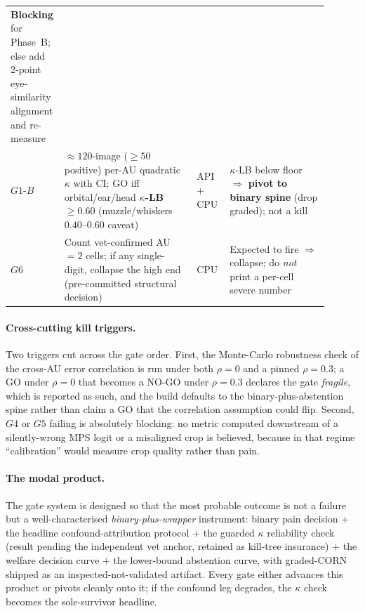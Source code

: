 \begin{table}[t]
\begin{tabular}{@{}p{0.10\linewidth}p{0.40\linewidth}p{0.10\linewidth}p{0.30\linewidth}@{}}
\textbf{Blocking} for Phase~B; else add 2-point eye-similarity alignment and re-measure \\
\addlinespace
$G1\text{-}B$ & $\approx 120$-image ($\geq 50$ positive) per-AU quadratic $\kappa$ with CI;
GO iff orbital/ear/head $\kappa$\textbf{-LB} $\geq 0.60$ (muzzle/whiskers $0.40\text{--}0.60$
caveat) &
API + CPU &
$\kappa$-LB below floor $\Rightarrow$ \textbf{pivot to binary spine} (drop graded); not a kill \\
\addlinespace
$G6$ & Count vet-confirmed AU$=2$ cells; if any single-digit, collapse the high end
(pre-committed structural decision) &
CPU &
Expected to fire $\Rightarrow$ collapse; do \emph{not} print a per-cell severe number \\
\bottomrule
\end{tabular}
\end{table}

\paragraph{Cross-cutting kill triggers.} Two triggers cut across the gate order. First, the
Monte-Carlo robustness check of the cross-AU error correlation is run under both $\rho=0$ and a
pinned $\rho=0.3$; a GO under $\rho=0$ that becomes a NO-GO under $\rho=0.3$ declares the gate
\emph{fragile}, which is reported as such, and the build defaults to the binary-plus-abstention spine rather
than claim a GO that the correlation assumption could flip. Second, $G4$ or $G5$ failing is
absolutely blocking: no metric computed downstream of a silently-wrong MPS logit or a
misaligned crop is believed, because in that regime ``calibration'' would measure crop quality
rather than pain.

\paragraph{The modal product.} The gate system is designed so that the most probable outcome is
not a failure but a well-characterised \emph{binary-plus-wrapper} instrument:
binary pain decision $+$ the headline confound-attribution protocol $+$ the guarded
$\kappa$ reliability check (result pending the independent vet anchor, retained as kill-tree
insurance) $+$ the welfare decision curve $+$ the lower-bound abstention curve, with graded-CORN
shipped as an inspected-not-validated artifact. Every gate either advances this product or pivots
cleanly onto it; if the confound leg degrades, the $\kappa$ check becomes the sole-survivor
headline.

